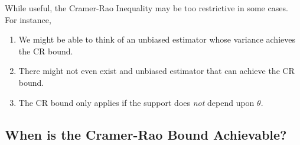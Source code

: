 \documentclass[a4paper,12pt]{scrartcl}
\begin{document}
While useful, the Cramer-Rao Inequality may be too restrictive in some
cases. For instance,
\begin{enumerate}
   \item{We might be able to think of an unbiased estimator  
      whose variance achieves the CR bound.
      }
   \item{There might not even exist and unbiased estimator that can
      achieve the CR bound.}
   \item{The CR bound only applies if the support does \emph{not} 
      depend upon $\theta$.}
\end{enumerate}

\subsection{When is the Cramer-Rao Bound Achievable?}
\end{document}
